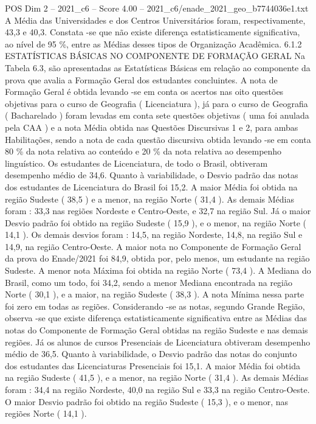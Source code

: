 \begin{textsample}{POS Dim 2 – 2021\_c6 – Score 4.00 – 2021\_c6/enade\_2021\_geo\_b7744036e1.txt}
A Média das Universidades e dos Centros Universitários foram, respectivamente, 43,3 e 40,3.
Constata -se que não existe diferença estatisticamente significativa, ao nível de 95 \%, entre as Médias desses tipos de Organização Acadêmica. 6.1.2 ESTATÍSTICAS BÁSICAS NO COMPONENTE DE FORMAÇÃO GERAL Na Tabela 6.3, são apresentadas as Estatísticas Básicas em relação ao componente da prova que avalia a Formação Geral dos estudantes concluintes.
A nota de Formação Geral é obtida levando -se em conta os acertos nas oito questões objetivas para o curso de Geografia ( Licenciatura ), já para o curso de Geografia ( Bacharelado ) foram levadas em conta sete questões objetivas ( uma foi anulada pela CAA ) e a nota Média obtida nas Questões Discursivas 1 e 2, para ambas Habilitações, sendo a nota de cada questão discursiva obtida levando -se em conta 80 \% da nota relativa ao conteúdo e 20 \% da nota relativa ao desempenho linguístico.
Os estudantes de Licenciatura, de todo o Brasil, obtiveram desempenho médio de 34,6.
Quanto à variabilidade, o Desvio padrão das notas dos estudantes de Licenciatura do Brasil foi 15,2.
A maior Média foi obtida na região Sudeste ( 38,5 ) e a menor, na região Norte ( 31,4 ).
As demais Médias foram : 33,3 nas regiões Nordeste e Centro-Oeste, e 32,7 na região Sul.
Já o maior Desvio padrão foi obtido na região Sudeste ( 15,9 ), e o menor, na região Norte ( 14,1 ).
Os demais desvios foram : 14,5, na região Nordeste, 14,8, na região Sul e 14,9, na região Centro-Oeste.
A maior nota no Componente de Formação Geral da prova do Enade/2021 foi 84,9, obtida por, pelo menos, um estudante na região Sudeste.
A menor nota Máxima foi obtida na região Norte ( 73,4 ).
A Mediana do Brasil, como um todo, foi 34,2, sendo a menor Mediana encontrada na região Norte ( 30,1 ), e a maior, na região Sudeste ( 38,3 ).
A nota Mínima nessa parte foi zero em todas as regiões.
Considerando -se as notas, segundo Grande Região, observa -se que existe diferença estatisticamente significativa entre as Médias das notas do Componente de Formação Geral obtidas na região Sudeste e nas demais regiões.
Já os alunos de cursos Presenciais de Licenciatura obtiveram desempenho médio de 36,5.
Quanto à variabilidade, o Desvio padrão das notas do conjunto dos estudantes das Licenciaturas Presenciais foi 15,1.
A maior Média foi obtida na região Sudeste ( 41,5 ), e a menor, na região Norte ( 31,4 ).
As demais Médias foram : 34,4 na região Nordeste, 40,0 na região Sul e 33,3 na região Centro-Oeste.
O maior Desvio padrão foi obtido na região Sudeste ( 15,3 ), e o menor, nas regiões Norte ( 14,1 ).

\end{textsample}
